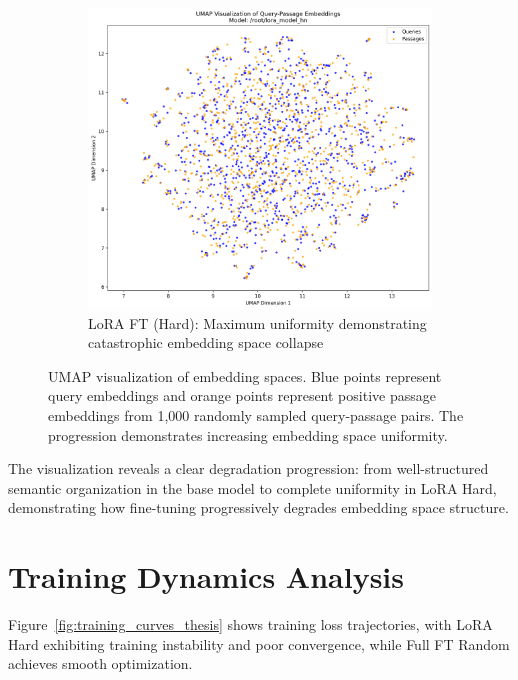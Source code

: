 \begin{figure}[p]
\vspace{0.8cm}

\begin{subfigure}{0.48\textwidth}
\centering
\includegraphics[width=\textwidth, height=0.75\textwidth, keepaspectratio]{umap_visualization__root_lora_model_hn.png}
\caption{LoRA FT (Hard): Maximum uniformity demonstrating catastrophic embedding space collapse}
\label{fig:umap_lora_hard_thesis}
\end{subfigure}

\caption{UMAP visualization of embedding spaces. Blue points represent query embeddings and orange points represent positive passage embeddings from 1,000 randomly sampled query-passage pairs. The progression demonstrates increasing embedding space uniformity.}
\label{fig:umap_all_thesis}
\end{figure}

The visualization reveals a clear degradation progression: from well-structured semantic organization in the base model to complete uniformity in LoRA Hard, demonstrating how fine-tuning progressively degrades embedding space structure.

\section{Training Dynamics Analysis}

Figure~\ref{fig:training_curves_thesis} shows training loss trajectories, with LoRA Hard exhibiting training instability and poor convergence, while Full FT Random achieves smooth optimization.

